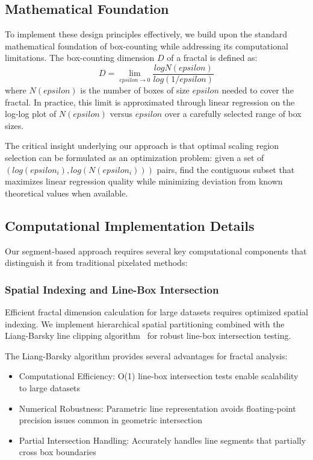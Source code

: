 \documentclass[preprint,12pt]{elsarticle}
\def\textbf#1{#1}%
\def\log{log}%
\def\epsilon{epsilon}%
\begin{document}
\subsection{Mathematical Foundation}

To implement these design principles effectively, we build upon the standard mathematical foundation of box-counting while addressing its computational limitations.
The box-counting dimension $D$ of a fractal is defined as:
\begin{equation}
D = \lim_{\epsilon \to 0} \frac{\log N(\epsilon)}{\log(1/\epsilon)}
\label{eq:box_counting_def}
\end{equation}
where $N(\epsilon)$ is the number of boxes of size $\epsilon$ needed to cover the fractal. In practice, this limit is approximated through linear regression on the log-log plot of $N(\epsilon)$ versus $\epsilon$ over a carefully selected range of box sizes.

The critical insight underlying our approach is that optimal scaling region selection can be formulated as an optimization problem: given a set of $(log(\epsilon_i), log(N(\epsilon_i)))$ pairs, find the contiguous subset that maximizes linear regression quality while minimizing deviation from known theoretical values when available.

\subsection{Computational Implementation Details}

Our segment-based approach requires several key computational components that distinguish it from traditional pixelated methods:

\subsubsection{Spatial Indexing and Line-Box Intersection}

Efficient fractal dimension calculation for large datasets requires optimized spatial indexing. We implement hierarchical spatial partitioning combined with the Liang-Barsky line clipping algorithm~\cite{liang1984} for robust line-box intersection testing.

The Liang-Barsky algorithm provides several advantages for fractal analysis:
\begin{itemize}
\item \textbf{Computational Efficiency}: O(1) line-box intersection tests enable scalability to large datasets
\item \textbf{Numerical Robustness}: Parametric line representation avoids floating-point precision issues common in geometric intersection
\item \textbf{Partial Intersection Handling}: Accurately handles line segments that partially cross box boundaries
\end{itemize}
\end{document}
